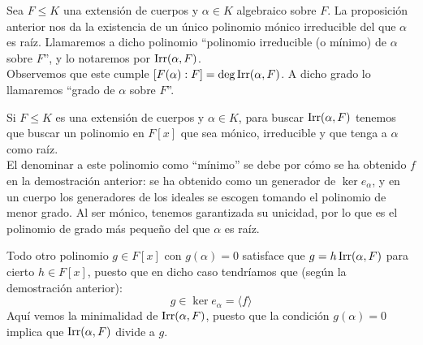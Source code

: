 \begin{definicion}
    Sea $F\leq K$ una extensión de cuerpos y $\alpha\in K$ algebraico sobre $F$. La proposición anterior nos da la existencia de un único polinomio mónico irreducible del que $\alpha$  es raíz. Llamaremos a dicho polinomio ``polinomio irreducible (o mínimo) de $\alpha$ sobre $F$'', y lo notaremos por $\operatorname{Irr}(\alpha,F)$.\\

    \noindent
    Observemos que este cumple $[F(\alpha):F] = \deg \operatorname{Irr}(\alpha,F)$. A dicho grado lo llamaremos ``grado de $\alpha$ sobre $F$''.
\end{definicion}

\noindent
Si $F\leq K$ es una extensión de cuerpos y $\alpha\in K$, para buscar $\operatorname{Irr}(\alpha,F)$ tenemos que buscar un polinomio en $F[x]$ que sea mónico, irreducible y que tenga a $\alpha$ como raíz.\\

\noindent
El denominar a este polinomio como ``mínimo'' se debe por cómo se ha obtenido $f$ en la demostración anterior: se ha obtenido como un generador de $\ker e_\alpha$, y en un cuerpo los generadores de los ideales se escogen tomando el polinomio de menor grado. Al ser mónico, tenemos garantizada su unicidad, por lo que es el polinomio de grado más pequeño del que $\alpha$ es raíz.

\begin{observacion}
    Todo otro polinomio $g\in F[x]$ con $g(\alpha)=0$ satisface que $g = h\operatorname{Irr}(\alpha,F)$ para cierto $h\in F[x]$, puesto que en dicho caso tendríamos que (según la demostración anterior):
    \begin{equation*}
        g \in \ker e_\alpha = \langle f \rangle 
    \end{equation*}
    Aquí vemos la minimalidad de $\operatorname{Irr}(\alpha,F)$, puesto que la condición $g(\alpha)= 0$ implica que $\operatorname{Irr}(\alpha,F)$ divide a $g$.
\end{observacion}

